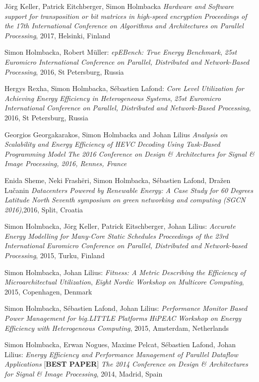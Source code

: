 \documentclass[margin,line]{resume}
\begin{document}
\begin{resume}
J\"{o}rg Keller, Patrick Eitchberger, Simon Holmbacka
\textit{Hardware and Software support for transposition or bit matrices in high-speed encryption}
\textsl{Proceedings of the 17th International Conference on Algorithms and Architectures on Parallel Processing}, 2017, Helsinki, Finland

Simon Holmbacka, Robert M\"{u}ller: 
\textit{epEBench: True Energy Benchmark},
\textsl{25st Euromicro International Conference on Parallel, Distributed and Network-Based Processing}, 2016, St Petersburg, Russia

Hergys Rexha, Simon Holmbacka, S\'{e}bastien Lafond: 
\textit{Core Level Utilization for Achieving Energy Efficiency in Heterogeneous Systems},
\textsl{25st Euromicro International Conference on Parallel, Distributed and Network-Based Processing}, 2016, St Petersburg, Russia

Georgios Georgakarakos, Simon Holmbacka and Johan Lilius
\textit{Analysis on Scalability and Energy Efficiency of HEVC Decoding Using Task-Based Programming Model}
\textsl{The 2016 Conference on Design \& Architectures for Signal \& Image Processing, 2016, Rennes, France}

Enida Sheme, Neki Frash\"{e}ri, Simon Holmbacka, S\'{e}bastien Lafond, Dra\v{z}en Lu\v{c}anin 
\textit{Datacenters Powered by Renewable Energy: A Case Study for 60 Degrees Latitude North}
\textsl{Seventh symposium on green networking and computing (SGCN 2016)},2016, Split, Croatia

Simon Holmbacka, J\"{o}rg Keller, Patrick Eitschberger, Johan Lilius:
\textit{Accurate Energy Modelling for Many-Core Static Schedules}
\textsl{Proceedings of the 23rd International Euromicro Conference on Parallel, Distributed and Network-based Processing}, 2015, Turku, Finland
\clearpage

Simon Holmbacka, Johan Lilius: 
\textit{Fitness: A Metric Describing the Efficiency of Microarchitectual Utilization},
\textsl{Eight Nordic Workshop on Multicore Computing}, 2015, Copenhagen, Denmark

Simon Holmbacka, S\'{e}bastien Lafond, Johan Lilius:
\textit{Performance Monitor Based Power Management for big.LITTLE Platforms}
\textsl{HiPEAC Workshop on Energy Efficiency with Heterogeneous Computing}, 2015, Amsterdam, Netherlands

Simon Holmbacka, Erwan Nogues, Maxime Pelcat, S\'{e}bastien Lafond, Johan Lilius:
\textit{Energy Efficiency and Performance Management of Parallel Dataflow Applications} [\textbf{BEST PAPER}]
\textsl{The 2014 Conference on Design \& Architectures for Signal \& Image Processing}, 2014, Madrid, Spain


\end{resume}
\end{document}
